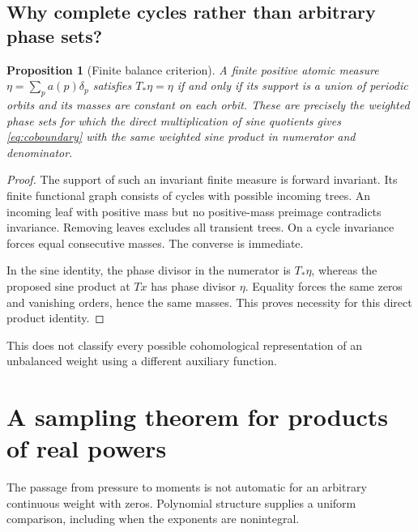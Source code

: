 \documentclass[11pt,a4paper]{article}
\numberwithin{equation}{section}
\newtheorem{proposition}[proposition]{Proposition}\aliascntresetthe{proposition}
\theoremstyle{definition}
\theoremstyle{remark}
\begin{document}
\subsection{Why complete cycles rather than arbitrary phase sets?}
\begin{proposition}[Finite balance criterion]
\label{prop:balance}
A finite positive atomic measure $\eta=\sum_p a(p)\delta_p$ satisfies
$T_*\eta=\eta$ if and only if its support is a union of periodic orbits
and its masses are constant on each orbit. These are precisely the
weighted phase sets for which the direct multiplication of sine
quotients gives \cref{eq:coboundary} with the same weighted sine product
in numerator and denominator.
\end{proposition}
\begin{proof}
The support of such an invariant finite measure is forward invariant.
Its finite functional graph consists of cycles with possible incoming
trees. An incoming leaf with positive mass but no positive-mass preimage
contradicts invariance. Removing leaves excludes all transient trees.
On a cycle invariance forces equal consecutive masses. The converse is
immediate.

In the sine identity, the phase divisor in the numerator is $T_*\eta$,
whereas the proposed sine product at $Tx$ has phase divisor $\eta$.
Equality forces the same zeros and vanishing orders, hence the same
masses. This proves necessity for this direct product identity.
\end{proof}
This does not classify every possible cohomological representation of
an unbalanced weight using a different auxiliary function.

\section{A sampling theorem for products of real powers}
\label{sec:sampling}
The passage from pressure to moments is not automatic for an arbitrary
continuous weight with zeros. Polynomial structure supplies a uniform
comparison, including when the exponents are nonintegral.
\end{document}
